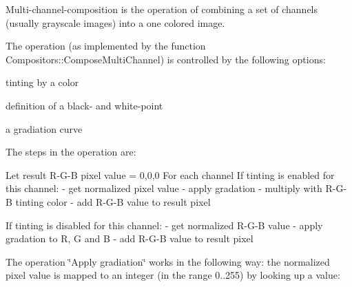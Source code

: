 Multi-\/channel-\/composition is the operation of combining a set of channels (usually grayscale images) into a one colored image.

The operation (as implemented by the function Compositors\+::\+Compose\+Multi\+Channel) is controlled by the following options\+:


\begin{DoxyItemize}
\item tinting by a color
\item definition of a black-\/ and white-\/point
\item a gradiation curve
\end{DoxyItemize}

The steps in the operation are\+: \begin{DoxyVerb}Let result R-G-B pixel value = 0,0,0
For each channel  
    If tinting is enabled for this channel:
        - get normalized pixel value
        - apply gradation
        - multiply with R-G-B tinting color
        - add R-G-B value to result pixel 

    If tinting is disabled for this channel:
        - get normalized R-G-B value
        - apply gradation to R, G and B
        - add R-G-B value to result pixel 
\end{DoxyVerb}


The operation \char`\"{}\+Apply gradiation\char`\"{} works in the following way\+: the normalized pixel value is mapped to an integer (in the range 0..255) by looking up a value\+:


